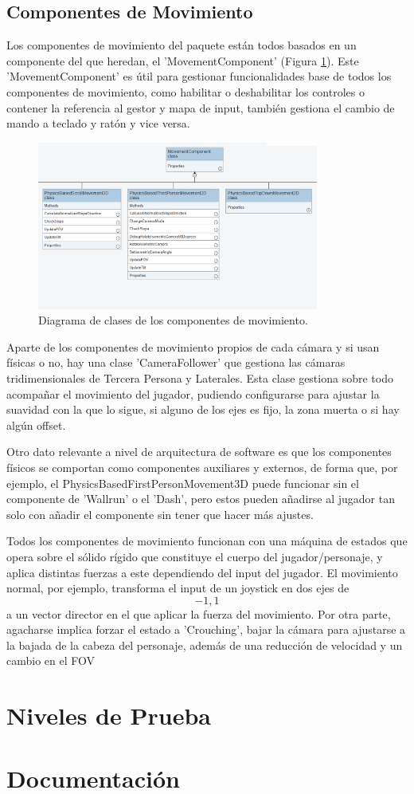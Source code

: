 \subsection{Componentes de Movimiento}
Los componentes de movimiento del paquete están todos basados en un componente del que heredan, el 'MovementComponent' (Figura \ref{fig:umlMovimiento}). Este 'MovementComponent' 
es útil para gestionar funcionalidades base de todos los componentes de movimiento, como habilitar o deshabilitar los controles o contener la referencia al gestor y mapa de input, 
también gestiona el cambio de mando a teclado y ratón y vice versa.

\begin{figure}[H]
  \centering
    \includegraphics[width=350px,clip=true]{Movement.png}
  \caption{Diagrama de clases de los componentes de movimiento.}
  \label{fig:umlMovimiento}
\end{figure}

Aparte de los componentes de movimiento propios de cada cámara y si usan físicas o no, hay una clase 'CameraFollower' que gestiona las cámaras tridimensionales de Tercera Persona 
y Laterales. Esta clase gestiona sobre todo acompañar el movimiento del jugador, pudiendo configurarse para ajustar la suavidad con la que lo sigue, si alguno de los ejes 
es fijo, la zona muerta o si hay algún offset.

Otro dato relevante a nivel de arquitectura de software es que los componentes físicos se comportan como componentes auxiliares y externos, de forma que, por ejemplo,
 el PhysicsBasedFirstPersonMovement3D puede funcionar sin el componente de 'Wallrun' o el 'Dash', pero estos pueden añadirse al jugador tan solo con añadir el componente sin
 tener que hacer más ajustes.
 
Todos los componentes de movimiento funcionan con una máquina de estados que opera sobre el sólido rígido que constituye el cuerpo del jugador/personaje, y aplica distintas 
fuerzas a este dependiendo del input del jugador. El movimiento normal, por ejemplo, transforma el input de un joystick en dos ejes de \[-1,1\] a un vector director en el que 
aplicar la fuerza del movimiento. Por otra parte, agacharse implica forzar el estado a 'Crouching', bajar la cámara para ajustarse a la bajada de la cabeza del personaje, además de una reducción de velocidad y
un cambio en el FOV

\section{Niveles de Prueba}


\section{Documentación}
